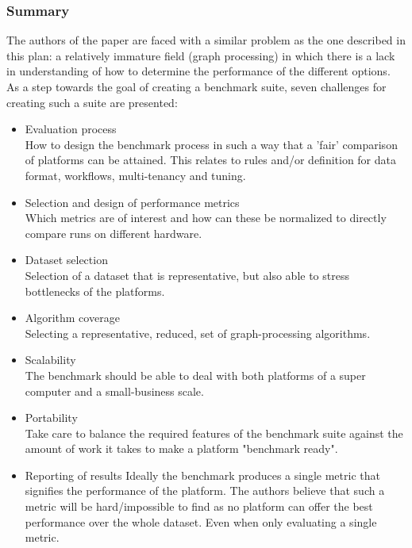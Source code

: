 \cite{guo2014benchmarking}
\subsubsection{Summary}
The authors of the paper are faced with a similar problem as the one described in this plan: a relatively immature field (graph processing) in which there is a lack in understanding of how to determine the performance of the different options. As a step towards the goal of creating a benchmark suite, seven challenges for creating such a suite are presented:
\begin{itemize}
\item Evaluation process\\
How to design the benchmark process in such a way that a 'fair' comparison of platforms can be attained. This relates to rules and/or definition for data format, workflows, multi-tenancy  and tuning.
\item Selection and design of performance metrics\\
Which metrics are of interest and how can these be normalized to directly compare runs on different hardware. 
\item Dataset selection\\
Selection of a dataset that is representative, but also able to stress bottlenecks of the platforms.
\item Algorithm coverage\\
Selecting a representative, reduced, set of graph-processing algorithms.
\item Scalability\\
The benchmark should be able to deal with both platforms of a super computer and a small-business scale.
\item Portability\\
Take care to balance the required features of the benchmark suite against the amount of work it takes to make a platform "benchmark ready".
\item Reporting of results
Ideally the benchmark produces a single metric that signifies the performance of the platform. The authors believe that such a metric will be hard/impossible to find as no platform can offer the best performance over the whole dataset. Even when only evaluating a single metric.
\end{itemize}

